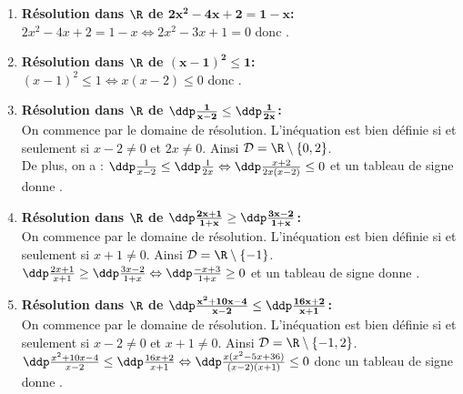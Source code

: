\begin{correction}
\begin{enumerate}
\item \textbf{R\'esolution dans $\mathbf{\R}$ de $\mathbf{2x^2-4x+2=1-x}$:}\\
\noindent $2x^2-4x+2=1-x\Leftrightarrow 2x^2-3x+1=0$ donc .
\item \textbf{R\'esolution dans $\mathbf{\R}$ de $\mathbf{(x-1)^2\leq 1}$:}\\
\noindent $(x-1)^2\leq 1\Leftrightarrow x(x-2)\leq 0$ donc .
\item \textbf{R\'esolution dans $\mathbf{\R}$ de $\mathbf{\ddp\frac{1}{x-2}\leq \ddp\frac{1}{2x}}$:}\\
\noindent On commence par le domaine de r\'esolution. L'in\'equation est bien d\'efinie si et seulement si $x-2\not= 0$ et $2x \not= 0$. Ainsi $\mathcal{D}=\R\setminus\left\lbrace 0,2 \right\rbrace$.\\
\noindent De plus, on a : $\ddp\frac{1}{x-2}\leq \ddp\frac{1}{2x}\Leftrightarrow \ddp\frac{x+2}{2x(x-2)}\leq 0$ et un tableau de signe donne 
.
\item \textbf{R\'esolution dans $\mathbf{\R}$ de $\mathbf{\ddp\frac{2x+1}{1+x}\geq \ddp\frac{3x-2}{1+x}}$:}\\
\noindent On commence par le domaine de r\'esolution. L'in\'equation est bien d\'efinie si et seulement si $x+1\not= 0$. Ainsi $\mathcal{D}=\R\setminus\left\lbrace -1 \right\rbrace$.\\
\noindent $\ddp\frac{2x+1}{x+1}\geq \ddp\frac{3x-2}{1+x}\Leftrightarrow \ddp\frac{-x+3}{1+x}\geq 0$ et un tableau de signe donne 
.
\item \textbf{R\'esolution dans $\mathbf{\R}$ de $\mathbf{\ddp\frac{x^2+10x-4}{x-2}\leq \ddp\frac{16x+2}{x+1}}$:}\\
\noindent On commence par le domaine de r\'esolution. L'in\'equation est bien d\'efinie si et seulement si $x-2\not= 0$ et $x+1 \not= 0$. Ainsi $\mathcal{D}=\R\setminus\left\lbrace -1,2 \right\rbrace$.\\
\noindent $\ddp\frac{x^2+10x-4}{x-2}\leq \ddp\frac{16x+2}{x+1}\Leftrightarrow \ddp\frac{x(x^2-5x+36)}{(x-2)(x+1)}\leq 0$ donc un tableau de signe donne .
\end{enumerate}
\end{correction}